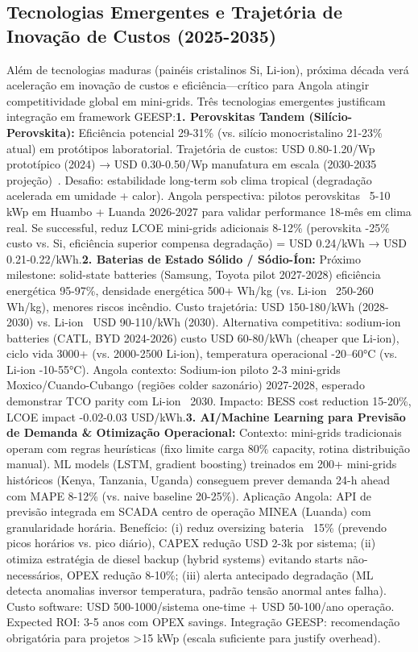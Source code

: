 \documentclass[12pt, a4paper]{article}
\begin{document}
\subsection{Tecnologias Emergentes e Trajetória de Inovação de Custos (2025-2035)}

Além de tecnologias maduras (painéis cristalinos Si, Li-ion), próxima década verá aceleração em inovação de custos e eficiência—crítico para Angola atingir competitividade global em mini-grids. Três tecnologias emergentes justificam integração em framework GEESP:\textbf{1. Perovskitas Tandem (Silício-Perovskita):}
Eficiência potencial 29-31\% (vs. silício monocristalino 21-23\% atual) em protótipos laboratorial. Trajetória de custos: USD 0.80-1.20/Wp prototípico (2024) → USD 0.30-0.50/Wp manufatura em escala (2030-2035 projeção)~\citep{NREL2024}. Desafio: estabilidade long-term sob clima tropical (degradação acelerada em umidade + calor). Angola perspectiva: pilotos perovskitas ~5-10 kWp em Huambo + Luanda 2026-2027 para validar performance 18-mês em clima real. Se successful, reduz LCOE mini-grids adicionais 8-12\% (perovskita -25\% custo vs. Si, eficiência superior compensa degradação) = USD 0.24/kWh → USD 0.21-0.22/kWh.\textbf{2. Baterias de Estado Sólido / Sódio-Íon:}
Próximo milestone: solid-state batteries (Samsung, Toyota pilot 2027-2028) eficiência energética 95-97\%, densidade energética 500+ Wh/kg (vs. Li-ion ~250-260 Wh/kg), menores riscos incêndio. Custo trajetória: USD 150-180/kWh (2028-2030) vs. Li-ion ~USD 90-110/kWh (2030). Alternativa competitiva: sodium-ion batteries (CATL, BYD 2024-2026) custo USD 60-80/kWh (cheaper que Li-ion), ciclo vida 3000+ (vs. 2000-2500 Li-ion), temperatura operacional -20--60°C (vs. Li-ion -10-55°C). Angola contexto: Sodium-ion piloto 2-3 mini-grids Moxico/Cuando-Cubango (regiões colder sazonário) 2027-2028, esperado demonstrar TCO parity com Li-ion ~2030. Impacto: BESS cost reduction 15-20\%, LCOE impact -0.02-0.03 USD/kWh.\textbf{3. AI/Machine Learning para Previsão de Demanda \& Otimização Operacional:}
Contexto: mini-grids tradicionais operam com regras heurísticas (fixo limite carga 80\% capacity, rotina distribuição manual). ML models (LSTM, gradient boosting) treinados em 200+ mini-grids históricos (Kenya, Tanzania, Uganda) conseguem prever demanda 24-h ahead com MAPE 8-12\% (vs. naive baseline 20-25\%). Aplicação Angola: API de previsão integrada em SCADA centro de operação MINEA (Luanda) com granularidade horária. Benefício: (i) reduz oversizing bateria ~15\% (prevendo picos horários vs. pico diário), CAPEX redução USD 2-3k por sistema; (ii) otimiza estratégia de diesel backup (hybrid systems) evitando starts não-necessários, OPEX redução 8-10\%; (iii) alerta antecipado degradação (ML detecta anomalias inversor temperatura, padrão tensão anormal antes falha). Custo software: USD 500-1000/sistema one-time + USD 50-100/ano operação. Expected ROI: 3-5 anos com OPEX savings. Integração GEESP: recomendação obrigatória para projetos >15 kWp (escala suficiente para justify overhead).
\end{document}
